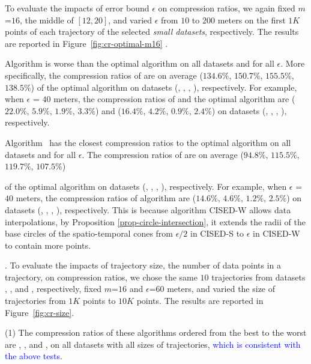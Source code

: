 {{%
To evaluate the impacts of error bound $\epsilon$ on compression ratios, we again fixed {$m$=$16$}, the middle of $[12, 20]$, and varied $\epsilon$ from $10$ to $200$ meters on the first $1K$ points of each trajectory of the selected \textit{small datasets}, respectively.
The results are reported in Figure~\ref{fig:cr-optimal-m16} .

 Algorithm \cist is worse than the optimal algorithm on all datasets and for all $\epsilon$.
More specifically, the compression ratios of \cist are on average ($134.6\%$, $150.7\%$, $155.5\%$, $138.5\%$) of the optimal algorithm on {datasets (\sercar, \geolife, \mopsi, \pricar)}, respectively.
For example, when $\epsilon$ = $40$ meters, the compression ratios of \cist and the optimal algorithm are
($22.0\%$, $5.9\%$, $1.9\%$, $3.3\%$) and {($16.4\%$, $4.2\%$, $0.9\%$, $2.4\%$)}
on  {datasets (\sercar, \geolife, \mopsi, \pricar)}, respectively.

 Algorithm \cista~has the closest compression ratios to the optimal algorithm on all datasets and for all $\epsilon$.
The compression ratios of \cista are on average  ($94.8\%$, $115.5\%$, $119.7\%$, $107.5\%$)} of the optimal algorithm on {datasets (\sercar, \geolife, \mopsi, \pricar)}, respectively.
For example, when $\epsilon$ = $40$ meters, the compression ratios of algorithm
\cista are ($14.6\%$, $4.6\%$, $1.2\%$, $2.5\%$) on datasets (\sercar, \geolife, \mopsi, \pricar), respectively.
%
{ This is because algorithm CISED-W allows data interpolations, by Proposition \ref{prop-circle-intersection}, it extends the radii of the base circles of the spatio-temporal cones from $\epsilon/2$ in CISED-S to $\epsilon$ in CISED-W to contain more points.}

.
To evaluate the impacts of trajectory size, \ie the number of data points in a trajectory, on compression ratios,
we chose the same {$10$} trajectories from datasets \sercar, \geolife, \mopsi and \pricar, respectively,
fixed {$m$=$16$} and $\epsilon$=$60$ meters, and varied the size  of trajectories from $1K$ points to $10K$ points.
%
The results are reported in Figure~\ref{fig:cr-size}.

\ni(1) The compression ratios of these algorithms ordered from the best to the worst are \cista, \dps, \cist and \squishe, on all datasets with all sizes of trajectories, \textcolor{blue}{which is consistent with the above tests}.

}
